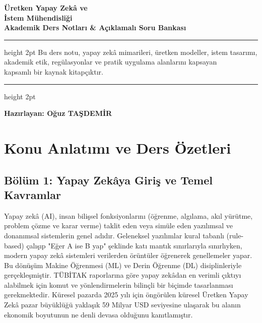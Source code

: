 \documentclass[11pt,a4paper,openany]{book}
\begin{document}
\shorthandoff{=}

% 
% 
\begin{titlepage}
    \centering
    \vspace*{2cm}
    {\huge\bfseries\sffamily Üretken Yapay Zekâ ve\\[0.3cm] İstem Mühendisliği}\\[0.5cm]
    {\Large\bfseries Akademik Ders Notları \& Açıklamalı Soru Bankası}\\[1.5cm]
    
    \hrule height 2pt
    \vspace{0.8cm}
    {\large Bu ders notu, yapay zekâ mimarileri, üretken modeller, istem tasarımı,\\[0.2cm] akademik etik, regülasyonlar ve pratik uygulama alanlarını kapsayan}\\[0.2cm]
    {\large kapsamlı bir kaynak kitapçıktır.}\\[0.8cm]
    \hrule height 2pt
    \vspace{1.5cm}
    
    {\Large\bfseries Hazırlayan: Oğuz TAŞDEMİR}\\[1.5cm]
    
    \end{titlepage}

\tableofcontents
\newpage

\chapter{Konu Anlatımı ve Ders Özetleri}

\section{Bölüm 1: Yapay Zekâya Giriş ve Temel Kavramlar}
Yapay zekâ (AI), insan bilişsel fonksiyonlarını (öğrenme, algılama, akıl yürütme, problem çözme ve karar verme) taklit eden veya simüle eden yazılımsal ve donanımsal sistemlerin genel adıdır. Geleneksel yazılımlar kural tabanlı (rule-based) çalışıp "Eğer A ise B yap" şeklinde katı mantık sınırlarıyla sınırlıyken, modern yapay zekâ sistemleri verilerden örüntüler öğrenerek genellemeler yapar. Bu dönüşüm Makine Öğrenmesi (ML) ve Derin Öğrenme (DL) disiplinleriyle gerçekleşmiştir. TÜBİTAK raporlarına göre yapay zekâdan en verimli çıktıyı alabilmek için komut ve yönlendirmelerin bilinçli bir biçimde tasarlanması gerekmektedir. Küresel pazarda 2025 yılı için öngörülen küresel Üretken Yapay Zekâ pazar büyüklüğü yaklaşık 59 Milyar USD seviyesine ulaşarak bu alanın ekonomik boyutunun ne denli devasa olduğunu kanıtlamıştır.
\end{document}
